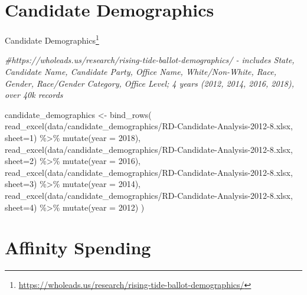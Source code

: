 \documentclass[
]{krantz}
\makeatletter
\newenvironment{Shaded}{\begin{snugshade}}{\end{snugshade}}
\newcommand{\AttributeTok}[1]{\textcolor[rgb]{0.61,0.61,0.61}{#1}}
\newcommand{\CommentTok}[1]{\textcolor[rgb]{0.37,0.37,0.37}{\textit{#1}}}
\newcommand{\DecValTok}[1]{\textcolor[rgb]{0.06,0.06,0.06}{#1}}
\newcommand{\FunctionTok}[1]{\textcolor[rgb]{0,0,0}{#1}}
\newcommand{\NormalTok}[1]{#1}
\newcommand{\OtherTok}[1]{\textcolor[rgb]{0.37,0.37,0.37}{#1}}
\newcommand{\SpecialCharTok}[1]{\textcolor[rgb]{0,0,0}{#1}}
\newcommand{\StringTok}[1]{\textcolor[rgb]{0.5,0.5,0.5}{#1}}
\renewcommand{\href}[2]{#2\footnote{\url{#1}}}
\newenvironment{kframe}{%
\medskip{}
\setlength{\fboxsep}{.8em}
 \def\at@end@of@kframe{}%
 \ifinner\ifhmode%
  \def\at@end@of@kframe{\end{minipage}}%
  \begin{minipage}{\columnwidth}%
 \fi\fi%
 \def\FrameCommand##1{\hskip\@totalleftmargin \hskip-\fboxsep
 \colorbox{shadecolor}{##1}\hskip-\fboxsep
     \hskip-\linewidth \hskip-\@totalleftmargin \hskip\columnwidth}%
 \MakeFramed {\advance\hsize-\width
   \@totalleftmargin\z@ \linewidth\hsize
   \@setminipage}}%
 {\par\unskip\endMakeFramed%
 \at@end@of@kframe}
\renewenvironment{Shaded}{\begin{kframe}}{\end{kframe}}
\makeatother
\begin{document}
\hypertarget{candidate-demographics}{%
\section*{Candidate Demographics}\label{candidate-demographics}}


\href{https://wholeads.us/research/rising-tide-ballot-demographics/}{Candidate Demographics}

\begin{Shaded}
\begin{Highlighting}[]
\CommentTok{\#https://wholeads.us/research/rising{-}tide{-}ballot{-}demographics/ {-} includes State, Candidate Name, Candidate Party, Office Name, White/Non{-}White, Race, Gender, Race/Gender Category, Office Level; 4 years (2012, 2014, 2016, 2018), over 40k records}

\NormalTok{candidate\_demographics }\OtherTok{\textless{}{-}} \FunctionTok{bind\_rows}\NormalTok{(}
  \FunctionTok{read\_excel}\NormalTok{(}\StringTok{\textquotesingle{}data/candidate\_demographics/RD{-}Candidate{-}Analysis{-}2012{-}8.xlsx\textquotesingle{}}\NormalTok{, }\AttributeTok{sheet=}\DecValTok{1}\NormalTok{) }\SpecialCharTok{\%\textgreater{}\%} 
    \FunctionTok{mutate}\NormalTok{(}\AttributeTok{year =} \DecValTok{2018}\NormalTok{),}
  \FunctionTok{read\_excel}\NormalTok{(}\StringTok{\textquotesingle{}data/candidate\_demographics/RD{-}Candidate{-}Analysis{-}2012{-}8.xlsx\textquotesingle{}}\NormalTok{, }\AttributeTok{sheet=}\DecValTok{2}\NormalTok{) }\SpecialCharTok{\%\textgreater{}\%} 
    \FunctionTok{mutate}\NormalTok{(}\AttributeTok{year =} \DecValTok{2016}\NormalTok{),}
  \FunctionTok{read\_excel}\NormalTok{(}\StringTok{\textquotesingle{}data/candidate\_demographics/RD{-}Candidate{-}Analysis{-}2012{-}8.xlsx\textquotesingle{}}\NormalTok{, }\AttributeTok{sheet=}\DecValTok{3}\NormalTok{) }\SpecialCharTok{\%\textgreater{}\%} 
    \FunctionTok{mutate}\NormalTok{(}\AttributeTok{year =} \DecValTok{2014}\NormalTok{),}
  \FunctionTok{read\_excel}\NormalTok{(}\StringTok{\textquotesingle{}data/candidate\_demographics/RD{-}Candidate{-}Analysis{-}2012{-}8.xlsx\textquotesingle{}}\NormalTok{, }\AttributeTok{sheet=}\DecValTok{4}\NormalTok{) }\SpecialCharTok{\%\textgreater{}\%} 
    \FunctionTok{mutate}\NormalTok{(}\AttributeTok{year =} \DecValTok{2012}\NormalTok{)}
\NormalTok{    )}
\end{Highlighting}
\end{Shaded}

\hypertarget{affinity-spending}{%
\section*{Affinity Spending}\label{affinity-spending}}
\end{document}
